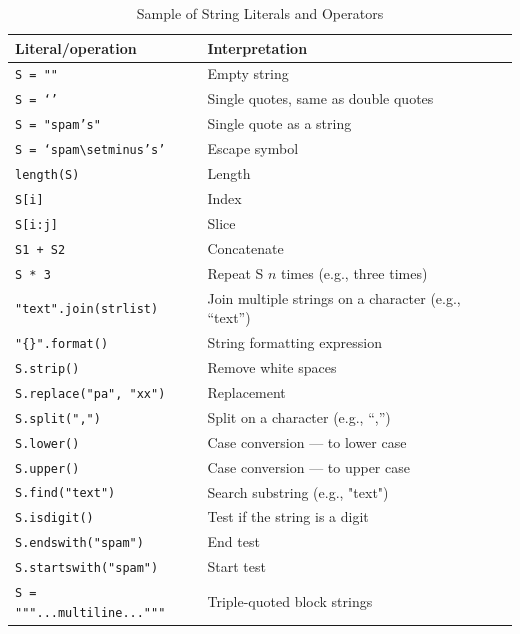 \documentclass[a4paper,11pt]{book}
\begin{document}
\begin{table}[!htbp]
	\centering
	\caption{Sample of String Literals and Operators}
	\label{tab:string_literals_and_operators}
	\begin{tabular}{ll}
		\toprule \toprule
		Literal/operation & Interpretation \\
		\midrule
		\texttt{S = ""} &  Empty string \\
		\texttt{S = `'} &   Single quotes, same as double quotes \\
		\texttt{S = "spam's"} & Single quote as a string \\
		\texttt{S = `spam$\setminus$'s'} & Escape symbol \\
		\texttt{length(S)} & Length \\
		\texttt{S[i]} & Index \\
		\texttt{S[i:j]} & Slice \\
		\texttt{S1 + S2} & Concatenate \\
		\texttt{S * 3} & Repeat S $n$ times (e.g., three times)\\
		\texttt{"text".join(strlist)} & Join multiple strings on a character (e.g., ``text'')\\
		\texttt{"\{\}".format()} & String formatting expression \\ 
		\texttt{S.strip()} & Remove white spaces \\
		\texttt{S.replace("pa", "xx")} & Replacement \\
		\texttt{S.split(",")} & Split on a character (e.g., ``,'') \\
		\texttt{S.lower()} & Case conversion --- to lower case \\
		\texttt{S.upper()} & Case conversion --- to upper case \\
        \texttt{S.find("text")} & Search substring (e.g., "text") \\
		\texttt{S.isdigit()} & Test if the string is a digit \\
		\texttt{S.endswith("spam")} & End test \\
        \texttt{S.startswith("spam")} & Start test \\
		\texttt{S = """...multiline..."""} & Triple-quoted block strings \\
		\bottomrule
	\end{tabular}
\end{table}
\end{document}
